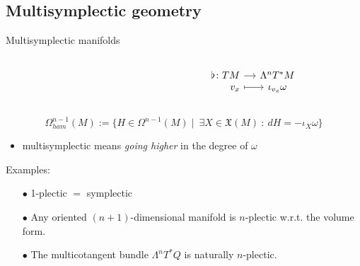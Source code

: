 \documentclass[handout,10pt]{beamer}
\begin{document}
\subsection{Multisymplectic geometry}
\begin{frame}[fragile]{Multisymplectic manifolds} %
	\begin{defblock}
		
	\end{defblock}
	\begin{defblock}
		\begin{columns}
			\hfill
			\begin{column}{.5\linewidth}
			\end{column}
			\begin{column}{.5\linewidth}
				\[
				\begin{tikzcd}[column sep= small,row sep=0ex,
				/tikz/column 1/.append style={anchor=base east}]
				    \flat \colon T M \ar[r]& \Lambda^n T^\ast M \\
  						 v_x \ar[r, mapsto]& \iota_{v_x} \omega						
				\end{tikzcd}	
				\]
			\end{column}
		\end{columns}
	\end{defblock}
	\pause
	\begin{defblock}
		\begin{displaymath}
			\Omega^{n-1}_{ham}(M) 	:=
			\biggr\{ H \in  \Omega^{n-1}(M) \; \biggr\vert \;~ 
				\exists X \in \mathfrak{X}(M) ~:~ d H = -\iota_X \omega \biggr\} 
			\end{displaymath}
	\end{defblock}
	\pause					
	\begin{itemize}
		\item multisymplectic means \emph{going higher} in the degree of $\omega$\pause
	\end{itemize}
	\vfill
	\begin{block}{Examples:}
		\begin{itemize}
			\item[$\bullet$] 1-plectic $=$ symplectic
			\item[$\bullet$] Any oriented $(n+1)$-dimensional manifold is $n$-plectic w.r.t. the volume form.
			\item[$\bullet$] The multicotangent bundle $\Lambda^n T^\ast Q$ is naturally $n$-plectic.
		\end{itemize}
	\end{block}			 
%
\end{frame}
\end{document}
